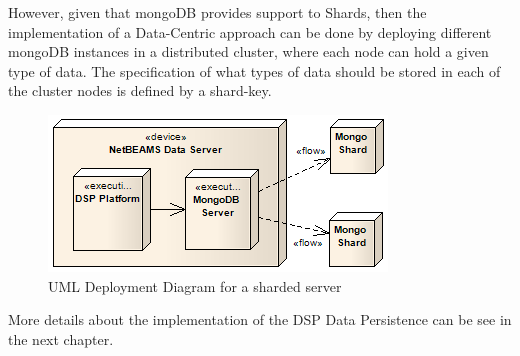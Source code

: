 However, given that mongoDB provides support to Shards, then the implementation
of a Data-Centric approach can be done by deploying different mongoDB instances
in a distributed cluster, where each node can hold a given type of data. The
specification of what types of data should be stored in each of the cluster
nodes is defined by a shard-key.

\begin{figure}[!b]
  \centering
  \includegraphics[scale=0.7]{../diagrams/DSP-Data-Persistence-Deployment-Sharded}
  \caption{UML Deployment Diagram for a sharded server}
  \label{fig:DSP-Data-Persistence-Deployment-Sharded}
\end{figure}

More details about the implementation of the DSP Data Persistence can be see in
the next chapter.

